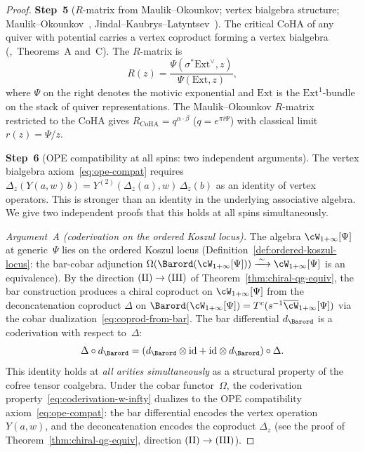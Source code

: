 \begin{proof}
\medskip
\noindent
\textbf{Step~5}
($R$-matrix from Maulik--Okounkov; vertex bialgebra
structure; Maulik--Okounkov~\cite{MO19},
Jindal--Kaubrys--Latyntsev~\cite{JKL26}).
The critical CoHA of any quiver with potential carries
a vertex coproduct forming a vertex
bialgebra (\cite{JKL26},~Theorems~A and~C). The
$R$-matrix is
\[
 R(z)
 = \frac{\Psi(\sigma^* \mathrm{Ext}^\vee, z)}
 {\Psi(\mathrm{Ext}, z)},
\]
where $\Psi$ on the right denotes the motivic exponential
and $\mathrm{Ext}$ is the $\mathrm{Ext}^1$-bundle on the
stack of quiver representations.
The Maulik--Okounkov $R$-matrix~\cite{MO19}
restricted to the CoHA gives
$R_{\mathrm{CoHA}} = q^{\alpha \cdot \beta}$
($q = e^{\pi i \Psi}$) with classical limit
$r(z) = \Psi/z$.

\medskip
\noindent
\textbf{Step~6}
(OPE compatibility at all spins: two independent
arguments).
The vertex bialgebra axiom~\eqref{eq:ope-compat}
requires $\Delta_z(Y(a,w)\,b)
= Y^{(2)}(\Delta_z(a),w)\,\Delta_z(b)$
as an identity of vertex operators. This is stronger than
an identity in the underlying associative algebra. We give two independent
proofs that this holds at all spins simultaneously.

\smallskip
\noindent\emph{Argument~A \textup{(}coderivation on the
ordered Koszul locus\textup{)}.}
The algebra $\cW_{1+\infty}[\Psi]$ at generic~$\Psi$ lies
on the ordered Koszul locus
\textup{(}Definition~\textup{\ref{def:ordered-koszul-locus}}:
the bar-cobar adjunction
$\Omega(\Barord(\cW_{1+\infty}[\Psi]))
\xrightarrow{\;\sim\;} \cW_{1+\infty}[\Psi]$ is an
equivalence\textup{)}. By the direction
$\textup{(II)} \to \textup{(III)}$ of
Theorem~\textup{\ref{thm:chiral-qg-equiv}}, the bar
construction produces a chiral coproduct on
$\cW_{1+\infty}[\Psi]$ from the deconcatenation coproduct
$\Delta$ on $\Barord(\cW_{1+\infty}[\Psi])
= T^c(s^{-1}\overline{\cW}_{1+\infty}[\Psi])$
via the cobar dualization~\eqref{eq:coprod-from-bar}.
The bar differential $d_{\Barord}$ is a coderivation with
respect to~$\Delta$:
\begin{equation}\label{eq:coderivation-w-infty}
 \Delta \circ d_{\Barord}
 =
 (d_{\Barord}\otimes\id+\id\otimes d_{\Barord})\circ\Delta .
\end{equation}
This identity holds at \emph{all arities
simultaneously} as a structural property of the cofree
tensor coalgebra. Under the cobar functor~$\Omega$, the
coderivation property~\eqref{eq:coderivation-w-infty}
dualizes to the OPE compatibility
axiom~\eqref{eq:ope-compat}: the bar differential
encodes the vertex operation $Y(a,w)$, and the
deconcatenation encodes the coproduct $\Delta_z$
\textup{(}see the proof of
Theorem~\textup{\ref{thm:chiral-qg-equiv}}, direction
$\textup{(II)} \to \textup{(III)}$\textup{)}.


\end{proof}
